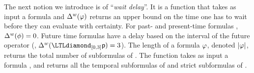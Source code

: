 The next notion we introduce is of ``\emph{wait delay}''. It is a function \wdelay that takes as input a formula \policy and 
$\Delta^w(\varphi)$ returns 
an upper bound on the time one has to wait before they can evaluate \policy with certainty. 
For past- and present-time formulas \policyv, $\Delta^w(\phi)=0$.
Future time formulas have a delay based on the interval of the future operator 
(\eg, $\wdelay(\LTLdiamond_{[0,3]} \pred{p}) = 3$). The length of a formula $\varphi$, denoted $|\varphi|$, returns the total number of subformulas of \policy.
The function \tempSub takes as input a formula \policy, and returns all the temporal subformulas \policyv of \policy and strict subformulas of \policyv. 





